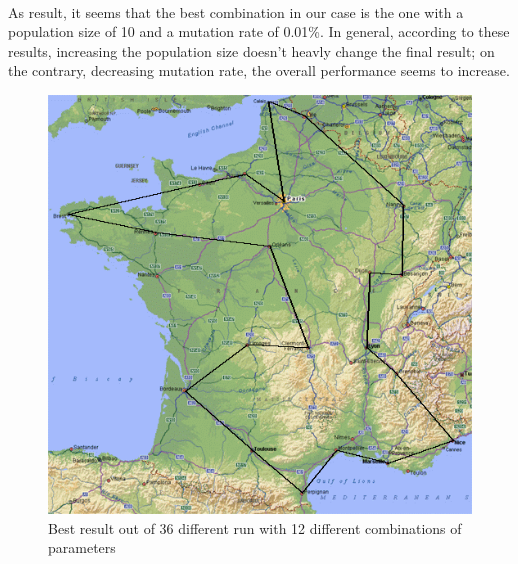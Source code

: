 \documentclass{article}
\begin{document}
\\
As result, it seems that the best combination in our case is the one with a population size of 10 and a mutation rate of 0.01\%. In general, according to these results, increasing the population size doesn't heavly change the final result; on the contrary, decreasing mutation rate, the overall performance seems to increase.

\begin{figure}
\centering
\includegraphics[width=\textwidth]{../result/exercise3/10_1_3/best.png}
\caption{Best result out of 36 different run with 12 different combinations of parameters}
\end{figure}    
\end{document}
